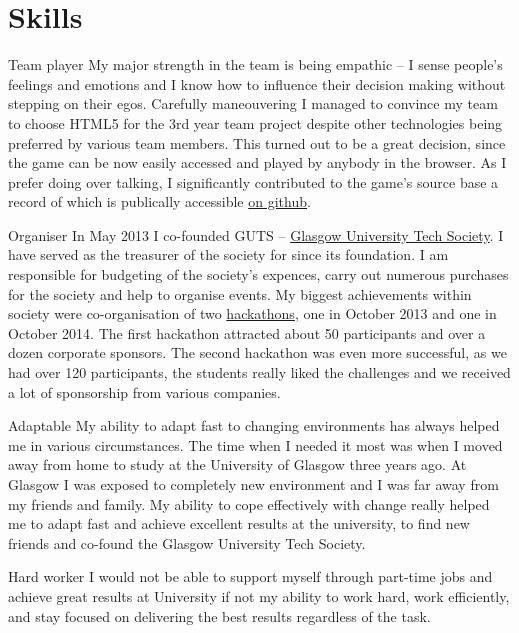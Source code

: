 \documentclass{tccv}
\begin{document}
\section{\LARGE Skills \normalsize}

\begin{skillist}
\item{Team player} {My major strength in the team is being empathic -- I sense people's feelings and emotions and I know how to influence their decision making without stepping on their egos. Carefully maneouvering I managed to convince my team to choose HTML5 for the 3rd year team project despite other technologies being preferred by various team members. This turned out to be a great decision, since the game can be now easily accessed and played by anybody in the browser. As I prefer doing over talking, I significantly contributed to the game's source base a record of which is publically accessible \href{https://github.com/ivababukova/TP3-Security-game}{on github}.}

\item{Organiser} {In May 2013 I co-founded GUTS -- \href{http://gutechsoc.com}{Glasgow University Tech Society}. I have served as the treasurer of the society for since its foundation. I am responsible for budgeting of the society's expences, carry out numerous purchases for the society and help to organise events. My biggest achievements within society were co-organisation of two \href{http://storify.com/Eventhread/gu-hackaton}{hackathons}, one in October 2013 and one in October 2014. The first hackathon attracted about 50 participants and over a dozen corporate sponsors. The second hackathon was even more successful, as we had over 120 participants, the students really liked the challenges and we received a lot of sponsorship from various companies.}

\item{Adaptable} {My ability to adapt fast to changing environments has always helped me in various circumstances. The time when I needed it most was when I moved away from home to study at the University of Glasgow three years ago. At Glasgow I was exposed to completely new environment and I was far away from my friends and family. My ability to cope effectively with change really helped me to adapt fast and achieve excellent results at the university, to find new friends and co-found the Glasgow University Tech Society.}

\item{Hard worker} {I would not be able to support myself through part-time jobs and achieve great results at University if not my ability to work hard, work efficiently, and stay focused on delivering the best results regardless of the task.}

\end{skillist}
\newpage
\end{document}
